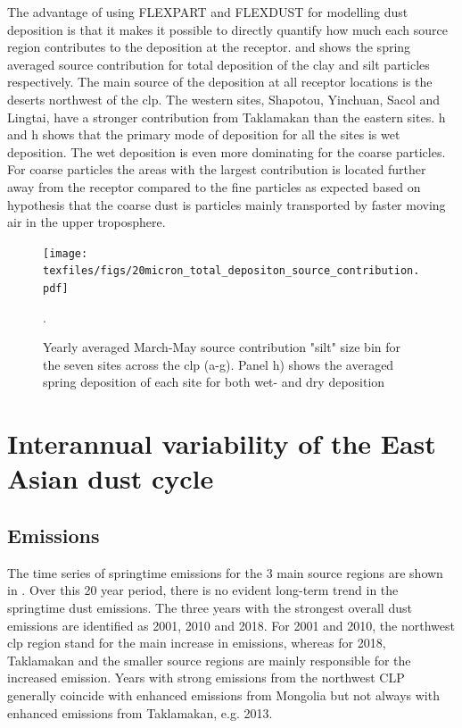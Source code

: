 The advantage of using FLEXPART and FLEXDUST for modelling dust deposition is that it makes it possible to directly quantify how much each source region contributes to the deposition at the receptor.   
 and  shows the spring averaged source contribution for total deposition of the clay and silt particles respectively. 
The main source of the deposition at all  receptor locations is the  deserts northwest of the \acrshort{clp}. 
The western sites, Shapotou, Yinchuan, Sacol and Lingtai, have a stronger contribution from Taklamakan than the eastern sites. 
h and h shows that the primary mode of deposition for all the sites is wet deposition.
The wet deposition is even more dominating for the coarse particles. 
For coarse particles the areas with the largest contribution is located further away from the receptor compared to the fine particles as expected based on hypothesis that the coarse dust is particles mainly transported by faster moving air in the upper troposphere.
    
 \begin{figure}[htbp]
    \centering
    \texttt{[image: texfiles/figs/20micron\_total\_depositon\_source\_contribution.pdf]}
    \caption{Yearly averaged March-May source contribution "silt" size bin for the seven sites across the \acrshort{clp} (a-g). Panel h) shows the averaged spring deposition of each site for both wet- and dry deposition}.
    \label{fig:source_contrib_20mmu}
\end{figure}

\section{Interannual variability of the East Asian dust cycle}\label{sec:inter_annual_results}

\subsection{Emissions}
The time series of springtime emissions for the 3 main source regions are shown in . Over this 20 year period, there is no evident long-term trend in the springtime dust emissions. 
The three years with the strongest overall dust emissions are identified as 2001, 2010 and 2018. For 2001 and 2010, the northwest \acrshort{clp} region stand for the main increase in emissions, whereas for 2018, Taklamakan and the smaller source regions are mainly responsible for the increased emission.
Years with strong emissions from the northwest CLP generally coincide with enhanced emissions from Mongolia but not always with enhanced emissions from Taklamakan, e.g. 2013.   

